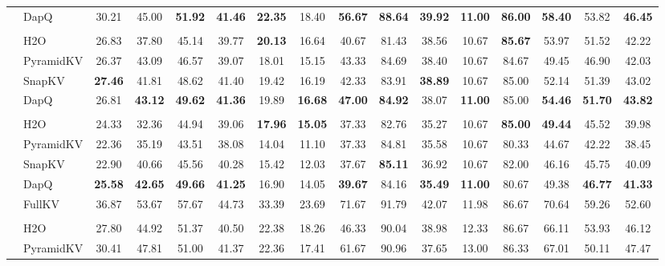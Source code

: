\begin{table}[t]
{\begin{tabular}{>{\bfseries}c >{\raggedright}p{1.2cm} *{14}{c}}
& DapQ & 30.21 & 45.00 & \textbf{51.92} & \textbf{41.46} & \textbf{22.35} & 18.40 & \textbf{56.67} & \textbf{88.64} & \textbf{39.92} & \textbf{11.00} & \textbf{86.00} & \textbf{58.40} & 53.82 & \textbf{46.45} \\
& \multicolumn{15}{c}{\cellcolor{gray!20}\textbf{KV Cache Size = 128}} \\
& H2O & 26.83 & 37.80 & 45.14 & 39.77 & \textbf{20.13} & 16.64 & 40.67 & 81.43 & 38.56 & 10.67 & \textbf{85.67} & 53.97 & 51.52 & 42.22 \\
& PyramidKV & 26.37 & 43.09 & 46.57 & 39.07 & 18.01 & 15.15 & 43.33 & 84.69 & 38.40 & 10.67 & 84.67 & 49.45 & 46.90 & 42.03 \\
& SnapKV & \textbf{27.46} & 41.81 & 48.62 & 41.40 & 19.42 & 16.19 & 42.33 & 83.91 & \textbf{38.89} & 10.67 & 85.00 & 52.14 & 51.39 & 43.02 \\
& DapQ & 26.81 & \textbf{43.12} & \textbf{49.62} & \textbf{41.36} & 19.89 & \textbf{16.68} & \textbf{47.00} & \textbf{84.92} & 38.07 & \textbf{11.00} & 85.00 & \textbf{54.46} & \textbf{51.70} & \textbf{43.82} \\
& \multicolumn{15}{c}{\cellcolor{gray!20}\textbf{KV Cache Size = 64}} \\
& H2O & 24.33 & 32.36 & 44.94 & 39.06 & \textbf{17.96} & \textbf{15.05} & 37.33 & 82.76 & 35.27 & 10.67 & \textbf{85.00} & \textbf{49.44} & 45.52 & 39.98 \\
& PyramidKV & 22.36 & 35.19 & 43.51 & 38.08 & 14.04 & 11.10 & 37.33 & 84.81 & 35.58 & 10.67 & 80.33 & 44.67 & 42.22 & 38.45 \\
& SnapKV & 22.90 & 40.66 & 45.56 & 40.28 & 15.42 & 12.03 & 37.67 & \textbf{85.11} & 36.92 & 10.67 & 82.00 & 46.16 & 45.75 & 40.09 \\
& DapQ & \textbf{25.58} & \textbf{42.65} & \textbf{49.66} & \textbf{41.25} & 16.90 & 14.05 & \textbf{39.67} & 84.16 & \textbf{35.49} & \textbf{11.00} & 80.67 & 49.38 & \textbf{46.77} & \textbf{41.33} \\
\midrule
& FullKV & 36.87 & 53.67 & 57.67 & 44.73 & 33.39 & 23.69 & 71.67 & 91.79 & 42.07 & 11.98 & 86.67 & 70.64 & 59.26 & 52.60 \\
& \multicolumn{15}{c}{\cellcolor{gray!20}\textbf{KV Cache Size = 256}} \\
\multirow{12}{*}{\rotatebox{90}{Qwen3-8B}} & H2O & 27.80 & 44.92 & 51.37 & 40.50 & 22.38 & 18.26 & 46.33 & 90.04 & 38.98 & 12.33 & 86.67 & 66.11 & 53.93 & 46.12 \\
& PyramidKV & 30.41 & 47.81 & 51.00 & 41.37 & 22.36 & 17.41 & 61.67 & 90.96 & 37.65 & 13.00 & 86.33 & 67.01 & 50.11 & 47.47 \\

\end{tabular}}
\end{table}
